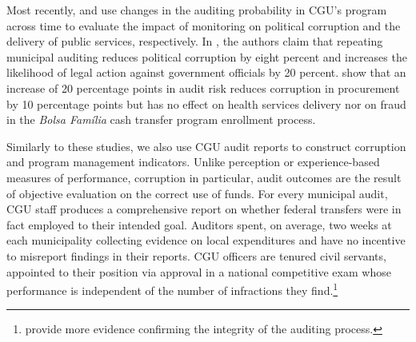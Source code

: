 \documentclass[11pt]{article}
\begin{document}
Most recently, \citet{FinanGovernmentAuditsReduce2018} and \citet{ZamboniAuditRiskRent2018} use changes in the auditing probability in CGU's program across time to evaluate the impact of monitoring on political corruption and the delivery of public services, respectively. In \citet{FinanGovernmentAuditsReduce2018}, the authors claim that repeating municipal auditing reduces political corruption by eight percent and increases the likelihood of legal action against government officials by 20 percent. \citet{ZamboniAuditRiskRent2018} show that an increase of 20 percentage points in audit risk reduces corruption in procurement by 10 percentage points but has no effect on health services delivery nor on fraud in the \emph{Bolsa Família} cash transfer program enrollment process.

Similarly to these studies, we also use CGU audit reports to construct corruption and program management indicators. Unlike perception or experience-based measures of performance, corruption in particular, audit outcomes are the result of objective evaluation on the correct use of funds. For every municipal audit, CGU staff produces a comprehensive report on whether federal transfers were in fact employed to their intended goal. Auditors spent, on average, two weeks at each municipality collecting evidence on local expenditures and have no incentive to misreport findings in their reports. CGU officers are tenured civil servants, appointed to their position via approval in a national competitive exam whose performance is independent of the number of infractions they find.\footnote{\citet{FerrazExposingCorruptPoliticians2008b,FerrazElectoralAccountabilityCorruption2011a,ZamboniAuditRiskRent2018} provide more evidence confirming the integrity of the auditing process.}
\end{document}

